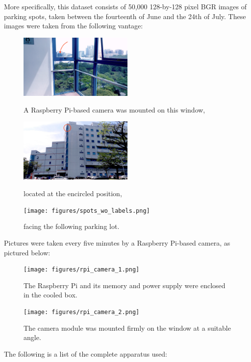 \documentclass[a4paper, 11pt]{article} %
\begin{document}
		\hspace*{-6mm}More specifically, this dataset consists of 50,000 128-by-128 pixel BGR images of 
		parking spots, taken between the fourteenth of June and the 24th of July. These images were taken 
		from the following vantage:
		\vskip 5mm
		\begin{figure}[H]
			\centering
			\includegraphics[width=0.5\textwidth]{figures/context_1.jpg}
			\caption{A Raspberry Pi-based camera was mounted on this window,}
			\vskip 5mm
			\includegraphics[width=0.5\textwidth]{figures/context_2.jpg}
			\caption{located at the encircled position,}
			\vskip 5mm
			\texttt{[image: figures/spots\_wo\_labels.png]}
			\caption{facing the following parking lot.}
		\end{figure}
		\vskip -5mm
		Pictures were taken every five minutes by a Raspberry Pi-based camera, as pictured below:
		\vskip 5mm
		\begin{figure}[H]
			\centering
			\texttt{[image: figures/rpi\_camera\_1.png]}
			\caption{The Raspberry Pi and its memory and power supply were 
			enclosed in the cooled box.}
			\vskip 5mm
			\texttt{[image: figures/rpi\_camera\_2.png]}
			\caption{The camera module was mounted firmly on the window at a 
			suitable angle.}
		\end{figure}
		The following is a list of the complete apparatus used:
\end{document}
